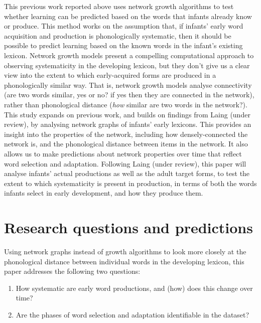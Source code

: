 \documentclass[
  man]{apa6}
\providecommand{\tightlist}{%
  \setlength{\itemsep}{0pt}\setlength{\parskip}{0pt}}
\begin{document}
This previous work reported above uses network growth algorithms to test whether learning can be predicted based on the words that infants already know or produce. This method works on the assumption that, if infants' early word acquisition and production is phonologically systematic, then it should be possible to predict learning based on the known words in the infant's existing lexicon. Network growth models present a compelling computational approach to observing systematicity in the developing lexicon, but they don't give us a clear view into the extent to which early-acquired forms are produced in a phonologically similar way. That is, network growth models analyse connectivity (are two words similar, yes or no? if yes then they are connected in the network), rather than phonological distance (\emph{how} similar are two words in the network?). This study expands on previous work, and builds on findings from Laing (under review), by analysing network graphs of infants' early lexicons. This provides an insight into the properties of the network, including how densely-connected the network is, and the phonological distance between items in the network. It also allows us to make predictions about network properties over time that reflect word selection and adaptation. Following Laing (under review), this paper will analyse infants' actual productions as well as the adult target forms, to test the extent to which systematicity is present in production, in terms of both the words infants select in early development, and how they produce them.

\hypertarget{research-questions-and-predictions}{%
\section{Research questions and predictions}\label{research-questions-and-predictions}}

Using network graphs instead of growth algorithms to look more closely at the phonological distance between individual words in the developing lexicon, this paper addresses the following two questions:

\begin{enumerate}
\def\labelenumi{\arabic{enumi}.}
\tightlist
\item
  How systematic are early word productions, and (how) does this change over time?
\item
  Are the phases of word selection and adaptation identifiable in the dataset?
\end{enumerate}
\end{document}
